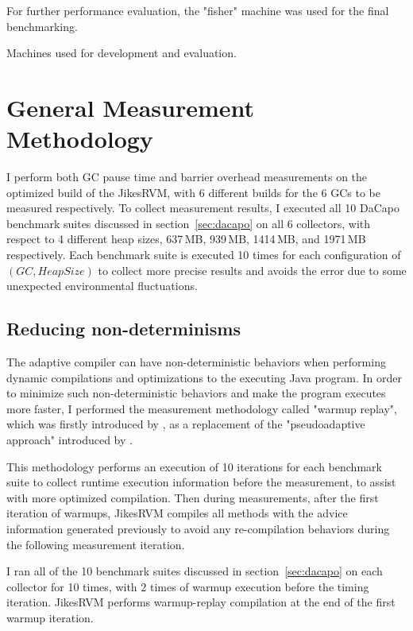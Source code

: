 For further performance evaluation, the "fisher" machine was used for the final benchmarking.

\begin{table*}
  \centering
  
  \caption{Machines used for development and evaluation.}
  \label{tab:machines}
\end{table*}

\section{General Measurement Methodology}
\label{sec:generalmethod}

I perform both GC pause time and barrier overhead measurements on the optimized build
of the JikesRVM, with 6 different builds for the 6 GCs to be measured respectively.
To collect measurement results, I executed all 10 DaCapo benchmark suites discussed in section~\ref{sec:dacapo}
on all 6 collectors, with respect to 4 different heap sizes, 637\,MB, 939\,MB, 1414\,MB, and 1971\,MB
respectively. Each benchmark suite is executed 10 times for each configuration of $(GC, HeapSize)$ to
collect more precise results and avoids the error due to some unexpected environmental fluctuations.

\subsection{Reducing non-determinisms}
\label{subsec:nondeterminisms}

The adaptive compiler can have non-deterministic behaviors when performing dynamic
compilations and optimizations to the executing Java program. In order to minimize
such non-deterministic behaviors and make the program executes more faster, I performed
the measurement methodology called "warmup replay", which was firstly introduced by
\cite{yang2012barriers}, as a replacement of the "pseudoadaptive approach" introduced by \cite{blackburn2004barriers}.

This methodology performs an execution of 10 iterations for each benchmark suite to
collect runtime execution information before the measurement, to assist with more optimized compilation.
Then during measurements, after the first iteration of warmups, JikesRVM compiles all
methods with the advice information generated previously to avoid any re-compilation
behaviors during the following measurement iteration.

I ran all of the 10 benchmark suites discussed in section~\ref{sec:dacapo} on each collector
for 10 times, with 2 times of warmup execution before the timing iteration.
JikesRVM performs warmup-replay compilation at the end of the first warmup iteration.


